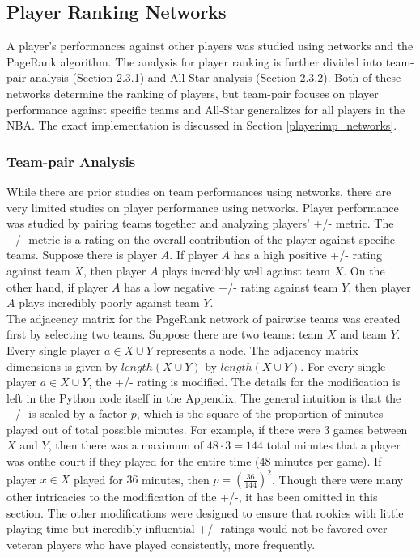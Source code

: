 \documentclass[12pt]{article}%
\begin{document}
\subsection{Player Ranking Networks}
\null\quad\quad A player's performances against other players was studied using networks and the PageRank algorithm. The analysis for player ranking is further divided into team-pair analysis (Section 2.3.1) and All-Star analysis (Section 2.3.2). Both of these networks determine the ranking of players, but team-pair focuses on player performance against specific teams and All-Star generalizes for all players in the NBA. The exact implementation is discussed in Section \ref{playerimp_networks}.
\subsubsection{Team-pair Analysis}
\null\quad\quad While there are prior studies on team performances using networks, there are very limited studies on player performance using networks. Player performance was studied by pairing teams together and analyzing players' +/- metric. The +/- metric is a rating on the overall contribution of the player against specific teams. Suppose there is player $A$. If player $A$ has a high positive +/- rating against team $X$, then player $A$ plays incredibly well against team $X$. On the other hand, if player $A$ has a low negative +/- rating against team $Y$, then player $A$ plays incredibly poorly against team $Y$.\\
\null\quad\quad The adjacency matrix for the PageRank network of pairwise teams was created first by selecting two teams. Suppose there are two teams: team $X$ and team $Y$. Every single player $a\in X\cup Y$ represents a node. The adjacency matrix dimensions is given by $length(X\cup Y)$-by-$length(X\cup Y)$. For every single player $a\in X\cup Y$, the +/- rating is modified. The details for the modification is left in the Python code itself in the Appendix. The general intuition is that the +/- is scaled by a factor $p$, which is the square of the proportion of minutes played out of total possible minutes. For example, if there were $3$ games between $X$ and $Y$, then there was a maximum of $48\cdot3=144$ total minutes that a player was onthe court if they played for the entire time ($48$ minutes per game). If player $x\in X$ played for $36$ minutes, then $p=(\frac{36}{144})^2$. Though there were many other intricacies to the modification of the +/-, it has been omitted in this section. The other modifications were designed to ensure that rookies with little playing time but incredibly influential +/- ratings would not be favored over veteran players who have played consistently, more frequently.\\
\end{document}
